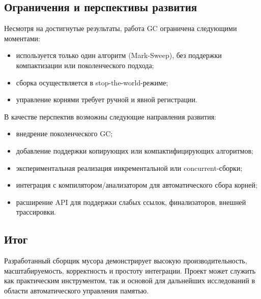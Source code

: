 \subsection*{Ограничения и перспективы развития}

Несмотря на достигнутые результаты, работа GC ограничена следующими моментами:

\begin{itemize}
    \item используется только один алгоритм (Mark-Sweep), без поддержки компактизации или поколенческого подхода;
    \item сборка осуществляется в stop-the-world-режиме;
    \item управление корнями требует ручной и явной регистрации.
\end{itemize}

В качестве перспектив возможны следующие направления развития:

\begin{itemize}
    \item внедрение поколенческого GC;
    \item добавление поддержки копирующих или компактифицирующих алгоритмов;
    \item экспериментальная реализация инкрементальной или concurrent-сборки;
    \item интеграция с компилятором/анализатором для автоматического сбора корней;
    \item расширение API для поддержки слабых ссылок, финализаторов, внешней трассировки.
\end{itemize}

\subsection*{Итог}

Разработанный сборщик мусора демонстрирует высокую производительность, масштабируемость, корректность и простоту интеграции. Проект может служить как практическим инструментом, так и основой для дальнейших исследований в области автоматического управления памятью.
